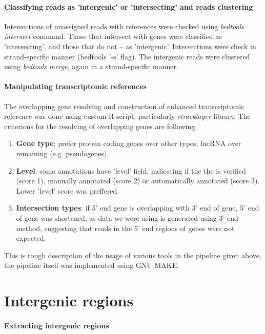 {\paragraph{Classifying reads as 'intergenic' or 'intersecting' and reads clustering}
Intersections of unassigned reads with references were checked using \textit{bedtools intersect} command.
Those that intersect with genes were classified as 'intersecting', and those that do not – as 'intergenic'.
Intersections were check in strand-specific manner (bedtools '-s' flag).
The intergenic reads were clustered using \textit{bedtools merge}, again in a strand-specific manner.

\paragraph{Manipulating transcriptomic references}
The overlapping gene resolving and construction of enhanced transcriptomic reference was done using custom R script,
particularly \textit{rtracklayer} library.
The criterions for the resolving of overlapping genes are following:
\begin{enumerate}
  \item \textbf{Gene type}: prefer protein coding genes over other types, lncRNA over remaining (e.g. pseudogenes).
  \item \textbf{Level}: some annotations have 'level' field, indicating if the the is verified (score 1), manually annotated (score 2)
  or automatically annotated (score 3). Lower 'level' score was preffered.
  \item \textbf{Intersection types}: if 5' end gene is overlapping with 3' end of gene, 5' end of gene was shortened,
  as data we were using is generated using 3' end method, suggesting that reads in the 5' end regions of genes were not expected.
\end{enumerate}

This is rough description of the usage of various tools in the pipeline given above, the pipeline itself was implemented using GNU MAKE.

\section{Intergenic regions}

\paragraph{Extracting intergenic regions}

}
